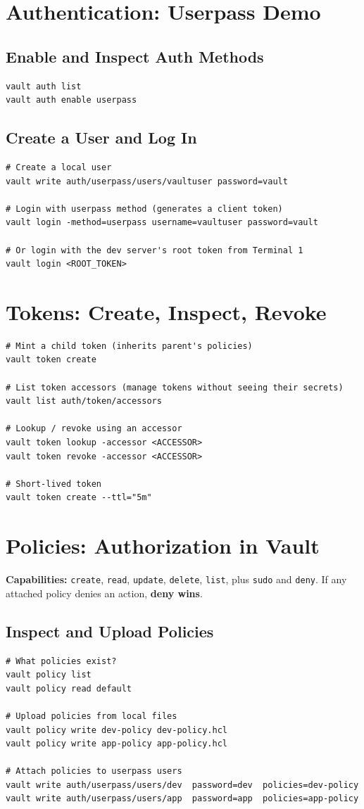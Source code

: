 \documentclass[11pt]{article}
\begin{document}
\section{Authentication: Userpass Demo}
\subsection{Enable and Inspect Auth Methods}
\begin{verbatim}
vault auth list
vault auth enable userpass
\end{verbatim}

\subsection{Create a User and Log In}
\begin{verbatim}
# Create a local user
vault write auth/userpass/users/vaultuser password=vault

# Login with userpass method (generates a client token)
vault login -method=userpass username=vaultuser password=vault

# Or login with the dev server's root token from Terminal 1
vault login <ROOT_TOKEN>
\end{verbatim}

\section{Tokens: Create, Inspect, Revoke}
\begin{verbatim}
# Mint a child token (inherits parent's policies)
vault token create

# List token accessors (manage tokens without seeing their secrets)
vault list auth/token/accessors

# Lookup / revoke using an accessor
vault token lookup -accessor <ACCESSOR>
vault token revoke -accessor <ACCESSOR>

# Short-lived token
vault token create --ttl="5m"
\end{verbatim}

\section{Policies: Authorization in Vault}
\textbf{Capabilities:} \texttt{create}, \texttt{read}, \texttt{update}, \texttt{delete}, \texttt{list}, plus \texttt{sudo} and \texttt{deny}. If any attached policy denies an action, \textbf{deny wins}.

\subsection{Inspect and Upload Policies}
\begin{verbatim}
# What policies exist?
vault policy list
vault policy read default

# Upload policies from local files
vault policy write dev-policy dev-policy.hcl
vault policy write app-policy app-policy.hcl

# Attach policies to userpass users
vault write auth/userpass/users/dev  password=dev  policies=dev-policy
vault write auth/userpass/users/app  password=app  policies=app-policy
\end{verbatim}
\end{document}
